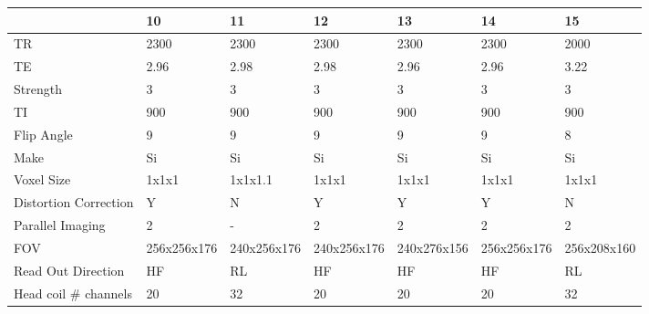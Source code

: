 \begin{table}
[]
\centering
\begin{tabular}{lllllll}
\toprule
{} & 10 & 11 & 12 & 13 & 14 & 15 \\
\midrule
TR                    &                 2300 &                 2300 &               2300 &                2300 &                2300 &                2000 \\
TE                    &                 2.96 &                 2.98 &               2.98 &                2.96 &                2.96 &                3.22 \\
Strength              &                    3 &                    3 &                  3 &                   3 &                   3 &                   3 \\
TI                    &                  900 &                  900 &                900 &                 900 &                 900 &                 900 \\
Flip Angle            &                    9 &                    9 &                  9 &                   9 &                   9 &                   8 \\
Make                  &                   Si &                   Si &                 Si &                  Si &                  Si &                  Si \\
Voxel Size            &                1x1x1 &              1x1x1.1 &              1x1x1 &               1x1x1 &               1x1x1 &               1x1x1 \\
Distortion Correction &                    Y &                    N &                  Y &                   Y &                   Y &                   N \\
Parallel Imaging      &                    2 &                    - &                  2 &                   2 &                   2 &                   2 \\
FOV                   &          256x256x176 &          240x256x176 &        240x256x176 &         240x276x156 &         256x256x176 &         256x208x160 \\
Read Out Direction    &                   HF &                   RL &                 HF &                  HF &                  HF &                  RL \\
Head coil \# channels  &                   20 &                   32 &                 20 &                  20 &                  20 &                  32 \\

\end{tabular}
\end{table}
